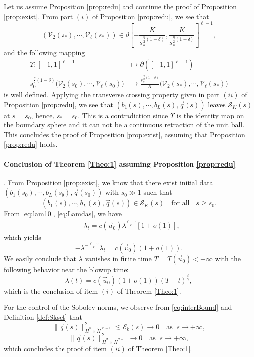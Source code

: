 \documentclass[11pt]{aims}
\theoremstyle{definition}
\numberwithin{equation}{section}
\begin{document}
Let us assume Proposition \ref{prop:redu} and continue the proof of Proposition \ref{prop:exist}. From part $(i)$ of Proposition \ref{prop:redu}, we see that 
$$({\mathcal{V}}_2(s_*), \cdots, {\mathcal{V}}_\ell(s_*)) \in \partial\left[- \frac{K}{s_*^{\frac{\eta}{2}(1 - \delta)}}, \frac{K}{s_*^{\frac{\eta}{2}(1 - \delta)}} \right]^{\ell - 1},$$
and the following mapping 
\begin{align*}
\Upsilon: [-1,1]^{\ell - 1} &\mapsto \partial \left([-1,1]^{\ell - 1}\right)\\
s_0^{\frac{\eta}{2}(1 - \delta)}\big({\mathcal{V}}_2(s_0), \cdots, {\mathcal{V}}_\ell(s_0)\big) & \to \frac{s_*^{\frac{\eta}{2}(1 - \delta)}}{K} \big({\mathcal{V}}_2(s_*), \cdots, {\mathcal{V}}_\ell(s_*)\big)
\end{align*}
is well defined. Applying the transverse crossing property given in part $(ii)$ of Proposition \ref{prop:redu}, we see that $(b_1(s), \cdots, b_L(s), \vec q(s))$ leaves ${\mathcal{S}}_K(s)$ at $s = s_0$, hence, $s_* = s_0$. This is a contradiction since $\Upsilon$ is the identity map on the boundary sphere and it can not be a continuous retraction of the unit ball. This concludes the proof of Proposition \ref{prop:exist}, assuming that Proposition \ref{prop:redu} holds.\\

\paragraph{Conclusion of Theorem \ref{Theo:1} assuming Proposition \ref{prop:redu}}. From Proposition \ref{prop:exist}, we know that there exist initial data $(b_1(s_0), \cdots, b_L(s_0), \vec q(s_0))$ with $s_0 \gg 1$ such that 
$$(b_1(s), \cdots, b_L(s), \vec q(s)) \in {\mathcal{S}}_K(s) \quad \text{for all} \quad s \geq s_0.$$ 
From \eqref{eq:lam10}, \eqref{eq:Lamdas}, we have 
\begin{align*}
-\lambda_t = c(\vec u_0)\lambda^{\frac{\ell - \gamma}{\ell}} \left[1+o(1)\right],
\end{align*}
which yields
$$-\lambda^{- \frac{\ell - \gamma}{\ell}}\lambda_t = c(\vec u_0)(1 + o(1)).$$
We easily conclude that $\lambda$ vanishes in finite time $T = T(\vec u_0) < +\infty$ with the following behavior near the blowup time:
$$\lambda(t) = c(\vec u_0)(1 + o(1))(T-t)^{\frac{\ell}{\gamma}},$$
which is the conclusion of item $(i)$ of Theorem \ref{Theo:1}. 

For the control of the Sobolev norms, we observe from \eqref{eq:interBound} and Definition \ref{def:Skset} that 
$$\|\vec q(s)\|^2_{\dot{H}^\Bbbk \times \dot{H}^{\Bbbk - 1}} \lesssim {\mathscr{E}}_{\Bbbk}(s) \to 0 \quad \text{as}\;\;s \to +\infty,$$
$$\|\vec q(s)\|^2_{\dot{H}^\sigma \times \dot{H}^{\sigma - 1}}\to 0  \quad \text{as}\;\;s \to +\infty,$$
which concludes the proof of item $(ii)$ of Theorem \ref{Theo:1}. 
\end{document}
